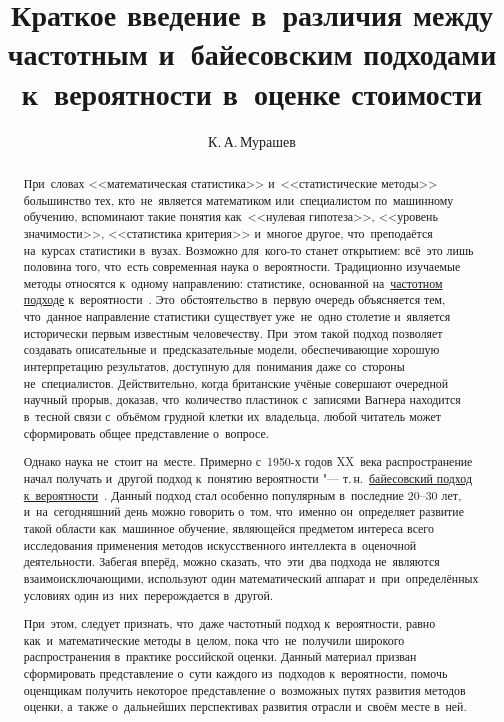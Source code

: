 \documentclass[]{scrartcl}
\title{Краткое введение в~различия между частотным и~байесовским подходами к~вероятности в~оценке стоимости}
\author{К.\,А.\,Мурашев}
\begin{document}
\maketitle

\begin{abstract}
	При~словах <<математическая статистика>> и~<<статистические методы>> большинство тех, кто~не~является математиком или~специалистом по~машинному обучению, вспоминают такие понятия как~<<нулевая гипотеза>>, <<уровень значимости>>, <<статистика критерия>>  и~многое другое, что~преподаётся на~курсах статистики в~вузах. Возможно для~кого-то станет открытием: всё~это лишь половина того, что~есть современная наука о~вероятности. Традиционно изучаемые методы относятся к~одному направлению: статистике, основанной на~\href{https://ru.wikipedia.org/wiki/Частотная_вероятность}{частотном подходе} к~вероятности~\cite{Wiki:Freq-probability}. Это~обстоятельство в~первую очередь объясняется тем, что~данное направление статистики существует уже~не~одно столетие и~является исторически первым известным человечеству. При~этом такой подход позволяет создавать описательные и~предсказательные модели, обеспечивающие хорошую интерпретацию результатов, доступную для~понимания даже со~стороны не~специалистов. Действительно, когда британские учёные совершают очередной научный прорыв, доказав, что~количество пластинок с~записями Вагнера находится в~тесной связи с~объёмом грудной клетки их~владельца, любой читатель может сформировать общее представление о~вопросе.
	
	Однако наука не~стоит на~месте. Примерно с~1950-х годов XX~века распространение начал получать и~другой подход к~понятию вероятности "--- т.\,н.~\href{https://ru.wikipedia.org/wiki/Байесовская_вероятность}{байесовский подход к~вероятности}~\cite{Wiki:Bayes-prob}. Данный подход стал особенно популярным в~последние 20--30 лет, и~на~сегодняшний день можно говорить о~том, что~именно он~определяет развитие такой области как~машинное обучение, являющейся предметом интереса всего исследования применения методов искусственного интеллекта в~оценочной деятельности. Забегая вперёд, можно сказать, что~эти~два подхода не~являются взаимоисключающими, используют один математический аппарат и~при~определённых условиях один из~них~перерождается в~другой.
	
	При~этом, следует признать, что~даже частотный подход к~вероятности, равно как~и~математические методы в~целом, пока что~не~получили широкого распространения в~практике российской оценки. Данный материал призван сформировать представление о~сути каждого из~подходов к~вероятности, помочь оценщикам получить некоторое представление о~возможных путях развития методов оценки, а~также о~дальнейших перспективах развития отрасли и~своём месте в~ней. 
\end{abstract}
\end{document}
